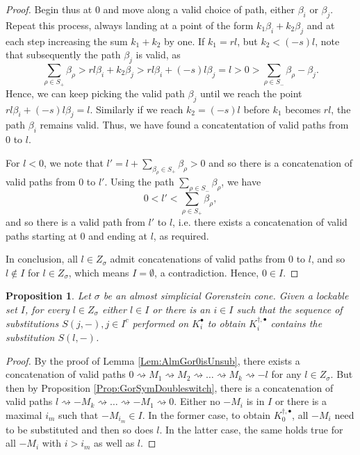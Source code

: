 \documentclass[reqno, 12pt]{amsart}
\newtheorem{proposition}[theorem]{Proposition}
\theoremstyle{definition}
\numberwithin{equation}{section}
\begin{document}
\begin{proof}
    Begin thus at 0 and move along a valid choice of path, either $\beta_i$ or $\beta_j$. Repeat this process, always landing at a point of the form $k_1\beta_i+k_2\beta_j$ and at each step increasing the sum $k_1+k_2$ by one. If $k_1=r l$, but $k_2<(-s)l$, note that subsequently the path $\beta_j$ is valid, as \[\sum_{\rho\in S_+}\beta_\rho>rl\beta_i+k_2\beta_j>rl\beta_i+(-s)l\beta_j=l>0>\sum_{\rho\in S_-}\beta_\rho-\beta_j.\]
    Hence, we can keep picking the valid path $\beta_j$ until we reach the point $rl\beta_i+(-s)l\beta_j=l$. Similarly if we reach $k_2=(-s)l$ before $k_1$ becomes $rl$, the path $\beta_i$ remains valid. Thus, we have found a concatentation of valid paths from 0 to $l$.

    For $l<0$, we note that $l'=l+\sum_{\beta_\rho\in S_+}\beta_\rho>0$ and so there is a concatenation of valid paths from 0 to $l'$. Using the path $\sum_{\rho\in S_-}\beta_\rho$, we have \[
    0<l'<\sum_{\rho\in S_+}\beta_\rho,
    \]
    and so there is a valid path from $l'$ to $l$, i.e. there exists a concatenation of valid paths starting at 0 and ending at $l$, as required. 

    \noindent In conclusion, all $l\in Z_\sigma$ admit concatenations of valid paths from $0$ to $l$, and so $l\not\in I$ for $l\in Z_\sigma$, which means $I=\emptyset$, a contradiction. Hence, $0\in I$.
\end{proof}

\begin{proposition}
    \label{Prop:AlmGorEverythingissubbed}
    Let $\sigma$ be an almost simplicial Gorenstein cone. Given a lockable set $I$, for every $l\in Z_\sigma$ either $l\in I$ or there is an $i\in I$ such that the sequence of substitutions $S(j,-), j\in I^c$ performed on $K_i^\bullet$ to obtain $K_i^{\dagger,\bullet}$ contains the substitution $S(l,-)$. 
\end{proposition}
\begin{proof}
    By the proof of Lemma \ref{Lem:AlmGor0isUnsub}, there exists a concatenation of valid paths $0\rightsquigarrow M_1\rightsquigarrow M_2\rightsquigarrow \dots \rightsquigarrow M_k \rightsquigarrow-l$ for any $l\in Z_\sigma$. But then by Proposition \ref{Prop:GorSymDoubleswitch}, there is a concatenation of valid paths $l\rightsquigarrow -M_k\rightsquigarrow\dots\rightsquigarrow-M_1\rightsquigarrow 0$. Either no $-M_i$ is in $I$ or there is a maximal $i_m$ such that $-M_{i_m}\in I$. In the former case, to obtain $K_0^{\dagger,\bullet}$, all $-M_i$ need to be substituted and then so does $l$. In the latter case, the same holds true for all $-M_i$ with $i>i_m$ as well as $l$.
\end{proof}
\end{document}

